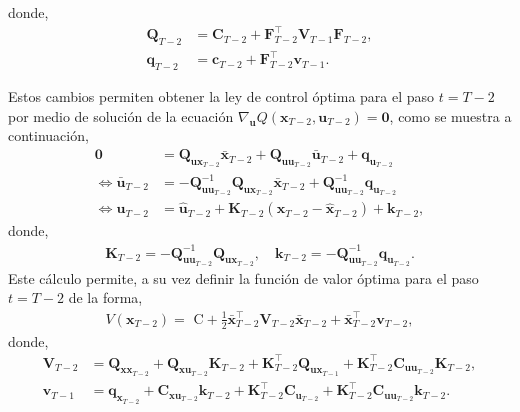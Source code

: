 donde,
\begin{align}
    \mathbf{Q}_{T-2} &= \mathbf{C}_{T-2} 
    + \mathbf{F}_{T-2}^{\top}\mathbf{V}_{T-1}
    \mathbf{F}_{T-2}, \\
    \mathbf{q}_{T-2} &= \mathbf{c}_{T-2} 
    + \mathbf{F}_{T-2}^{\top}\mathbf{v}_{T-1}.
\end{align}

Estos cambios permiten obtener la ley de control óptima para el paso $t=T-2$ por medio de solución de la ecuación $\nabla_{\mathbf{u}}Q(\mathbf{x}_{T-2}, \mathbf{u}_{T-2})= \mathbf{0}$, como se muestra a continuación,
\begin{equation}
    \begin{aligned}
    \bm{0} &= \mathbf{Q}_{\mathbf{ux}_{T-2}}
    \bar{\mathbf{x}}_{T-2} + \mathbf{Q}_{\mathbf{uu}_{T-2}} \bar{\mathbf{u}}_{T-2}
    + \mathbf{q}_{\mathbf{u}_{T-2}} \\
    \iff \bar{\mathbf{u}}_{T-2} &= 
    -\textbf{Q}_{\mathbf{u} \mathbf{u}_{T-2}}^{-1}\mathbf{Q}_{\mathbf{u}\mathbf{x}_{T-2}} \bar{\mathbf{x}}_{T-2}+ \mathbf{Q}_{\mathbf{u} \mathbf{u}_{T-2}}^{-1}\mathbf{q}_{\mathbf{u}_{T-2}}  \\
    \iff \mathbf{u}_{T-2} &= \hat{\mathbf{u}}_{T-2}
    + \mathbf{K}_{T-2} (\mathbf{x}_{T-2}-\hat{\mathbf{x}}_{T-2})+ \mathbf{k}_{T-2},
    \end{aligned}
\end{equation}
donde,
\begin{align}
    \mathbf{K}_{T-2} = -\textbf{Q}_{\mathbf{u} \mathbf{u}_{T-2}}^{-1}\mathbf{Q}_{\mathbf{u}\mathbf{x}_{T-2}}, \quad \mathbf{k}_{T-2}= -\mathbf{Q}_{\mathbf{u} \mathbf{u}_{T-2}}^{-1}\mathbf{q}_{\mathbf{u}_{T-2}}.
\end{align}
Este cálculo permite, a su vez definir la función de valor óptima para el paso $t=T-2$ de la forma, 
\begin{align}
    V(\mathbf{x}_{T-2}) = \text{ C} 
    + \frac{1}{2}\bar{\mathbf{x}}_{T-2}^{\top}
    \mathbf{V}_{T-2}
    \bar{\mathbf{x}}_{T-2}
    + 
    \bar{\mathbf{x}}_{T-2}^{\top}
    \mathbf{v}_{T-2},
\end{align}
donde,
\begin{align}
    \mathbf{V}_{T-2} &= \mathbf{Q}_{\mathbf{xx}_{T-2}}
    + \mathbf{Q}_{\mathbf{xu}_{T-2}}\mathbf{K}_{T-2}
    + \mathbf{K}_{T-2}^{\top}\mathbf{Q}_{\mathbf{ux}_{T-1}}
    + \mathbf{K}_{T-2}^{\top}\mathbf{C}_{\mathbf{uu}_{T-2}}\mathbf{K}_{T-2}, \\
    \mathbf{v}_{T-1} &= \mathbf{q}_{\mathbf{x}_{T-2}}
    + \mathbf{C}_{\mathbf{xu}_{T-2}}\mathbf{k}_{T-2}
    +\mathbf{K}_{T-2}^{\top}\mathbf{C}_{\mathbf{u}_{T-2}}
    + \mathbf{K}_{T-2}^{\top}\mathbf{C}_{\mathbf{uu}_{T-2}}\mathbf{k}_{T-2}.
\end{align}

